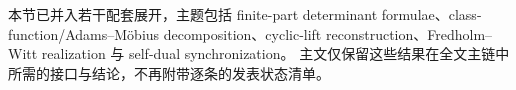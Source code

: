 \documentclass[../../../main.tex]{subfiles}
\begin{document}

\begin{remark}
本节已并入若干配套展开，主题包括 finite-part determinant formulae、class-function/Adams--M\"obius decomposition、cyclic-lift reconstruction、Fredholm--Witt realization 与 self-dual synchronization。
主文仅保留这些结果在全文主链中所需的接口与结论，不再附带逐条的发表状态清单。
\end{remark}
\end{document}
